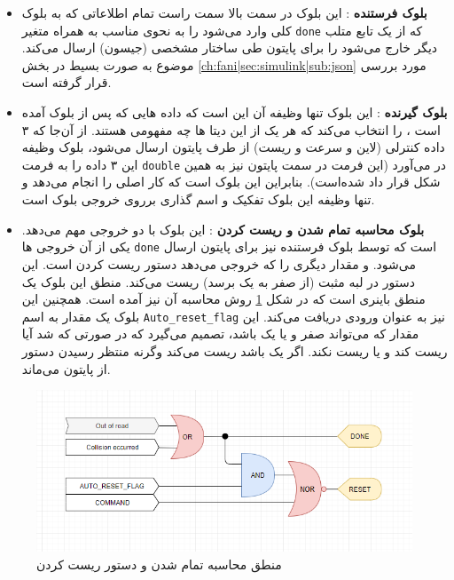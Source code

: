    \begin{itemize}
   		\item \textbf{بلوک فرستنده} :
   		این بلوک در سمت بالا سمت راست تمام اطلاعاتی که به بلوک کلی 
   		وارد می‌شود را به نحوی مناسب به همراه متغیر \texttt{done} که از یک تابع متلب دیگر خارج می‌شود را برای پایتون طی ساختار مشخصی (جیسون) ارسال می‌کند. موضوع به صورت بسیط در بخش
   		\ref{ch:fani|sec:simulink|sub:json}
   		مورد بررسی قرار گرفته است.
   		\item \textbf{بلوک گیرنده} :
   		این بلوک تنها وظیفه آن این است که داده هایی که پس از بلوک  آمده است ، را انتخاب می‌کند که هر یک از این دیتا ها چه مفهومی هستند. از آن‌جا که ۳ داده کنترلی (لاین و سرعت و ریست) از طرف پایتون ارسال می‌شود، بلوک  وظیفه این ۳ داده را به فرمت \texttt{double} در می‌آورد (این فرمت در سمت پایتون نیز به همین شکل قرار داد شده‌است). بنابراین این بلوک  است که کار اصلی را انجام می‌دهد و تنها وظیفه این بلوک تفکیک و اسم گذاری بر‌روی خروجی بلوک  است.
   
   		\item \textbf{بلوک محاسبه تمام شدن و ریست کردن} :
   		این بلوک با دو خروجی مهم می‌دهد. یکی از آن خروجی ها \texttt{done} است که توسط بلوک فرستنده نیز برای پایتون ارسال می‌شود. و مقدار دیگری را که خروجی می‌دهد دستور ریست کردن است. این دستور در لبه مثبت (از صفر به یک برسد) ریست می‌کند. منطق این بلوک یک منطق باینری است که در شکل 
   		\ref{fig:done-reset-logical}
   		روش محاسبه آن نیز آمده است. 
   		همچنین این بلوک یک مقدار به اسم \texttt{Auto\_reset\_flag} نیز به عنوان ورودی دریافت می‌کند. این مقدار که می‌تواند صفر و یا یک باشد، تصمیم می‌گیرد که در صورتی که  شد آیا ریست کند و یا ریست نکند. اگر یک باشد ریست می‌کند وگرنه منتظر رسیدن دستور از پایتون می‌ماند.
   		
   \end{itemize}

\begin{figure}
	\centering
	\includegraphics[width=0.7\linewidth]{Figures/done-reset-logical}
	\caption{منطق محاسبه تمام شدن و دستور ریست کردن}
	\label{fig:done-reset-logical}
\end{figure}

